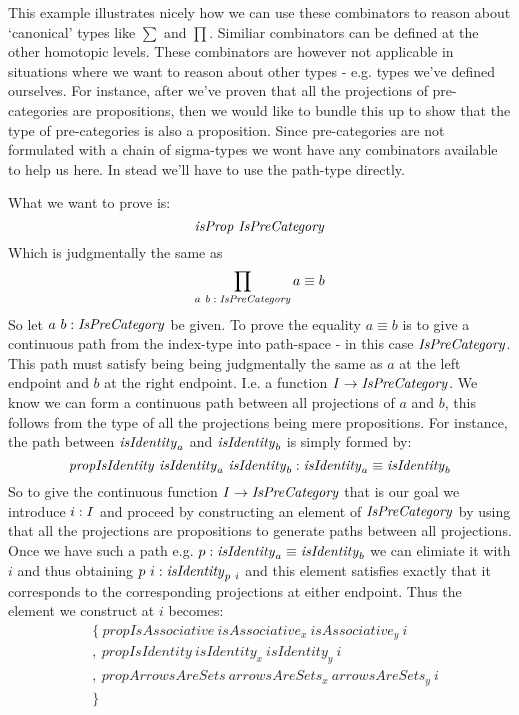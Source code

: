 This example illustrates nicely how we can use these combinators to reason about
`canonical' types like $\sum$ and $\prod$. Similiar combinators can be defined
at the other homotopic levels. These combinators are however not applicable in
situations where we want to reason about other types - e.g. types we've defined
ourselves. For instance, after we've proven that all the projections of
pre-categories are propositions, then we would like to bundle this up to show
that the type of pre-categories is also a proposition. Since pre-categories are
not formulated with a chain of sigma-types we wont have any combinators
available to help us here. In stead we'll have to use the path-type directly.

What we want to prove is:
%
$$
\isProp\ \IsPreCategory
$$
%
Which is judgmentally the same as
%
$$
\prod_{a\ b \;\mathord{:}\; \mathit{IsPreCategory}} a \equiv b
$$
%
So let $a\ b \;\mathord{:}\; \mathit{IsPreCategory}$ be given. To prove the equality $a \equiv b$ is
to give a continuous path from the index-type into path-space - in this case
$\mathit{IsPreCategory}$. This path must satisfy being being judgmentally the same as
$a$ at the left endpoint and $b$ at the right endpoint. I.e. a function $I \to
\mathit{IsPreCategory}$. We know we can form a continuous path between all projections
of $a$ and $b$, this follows from the type of all the projections being mere
propositions. For instance, the path between $\mathit{isIdentity}_a$ and $\mathit{isIdentity}_b$
is simply formed by:
%
$$
\mathit{propIsIdentity}\ \mathit{isIdentity}_a\ \mathit{isIdentity}_b \;\mathord{:}\; \mathit{isIdentity}_a \equiv \mathit{isIdentity}_b
$$
%
So to give the continuous function $I \to \mathit{IsPreCategory}$ that is our goal we
introduce $i \;\mathord{:}\; I$ and proceed by constructing an element of $\mathit{IsPreCategory}$
by using that all the projections are propositions to generate paths between all
projections. Once we have such a path e.g. $p : \mathit{isIdentity}_a \equiv
\mathit{isIdentity}_b$ we can elimiate it with $i$ and thus obtaining $p\ i \;\mathord{:}\;
\mathit{isIdentity}_{p\ i}$ and this element satisfies exactly that it corresponds to
the corresponding projections at either endpoint. Thus the element we construct
at $i$ becomes:
%
\begin{align*}
  & \{\ \mathit{propIsAssociative}\   \mathit{isAssociative}_x\
       \mathit{isAssociative}_y\ i  \\
  & ,\  \mathit{propIsIdentity}\      \mathit{isIdentity}_x\
       \mathit{isIdentity}_y\ i  \\
  & ,\  \mathit{propArrowsAreSets}\ \mathit{arrowsAreSets}_x\
       \mathit{arrowsAreSets}_y\ i  \\
  & \}
\end{align*}
